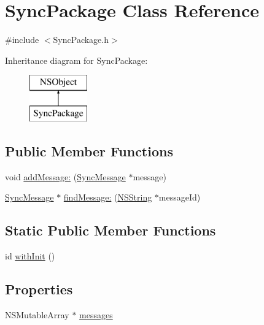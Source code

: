 \hypertarget{interface_sync_package}{
\section{\-Sync\-Package \-Class \-Reference}
\label{interface_sync_package}
}


{\ttfamily \#include $<$\-Sync\-Package.\-h$>$}

\-Inheritance diagram for \-Sync\-Package\-:\begin{figure}[H]
\begin{center}
\leavevmode
\includegraphics[height=2.000000cm]{interface_sync_package}
\end{center}
\end{figure}
\subsection*{\-Public \-Member \-Functions}
\begin{DoxyCompactItemize}
\item 
void \hyperlink{interface_sync_package_a56b6e60316327d8101c3c101a84f0f79}{add\-Message\-:} (\hyperlink{interface_sync_message}{\-Sync\-Message} $\ast$message)
\item 
\hyperlink{interface_sync_message}{\-Sync\-Message} $\ast$ \hyperlink{interface_sync_package_ae1ce725c36c08f0ed50e62a9abe53666}{find\-Message\-:} (\hyperlink{class_n_s_string}{\-N\-S\-String} $\ast$message\-Id)
\end{DoxyCompactItemize}
\subsection*{\-Static \-Public \-Member \-Functions}
\begin{DoxyCompactItemize}
\item 
id \hyperlink{interface_sync_package_aace2add7318eeac87c0bfff384dc508d}{with\-Init} ()
\end{DoxyCompactItemize}
\subsection*{\-Properties}
\begin{DoxyCompactItemize}
\item 
\-N\-S\-Mutable\-Array $\ast$ \hyperlink{interface_sync_package_abad6a6fc70f5fe4bdf8a4d60f0b36816}{messages}
\end{DoxyCompactItemize}


